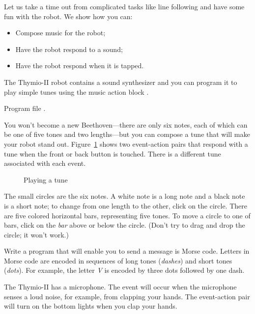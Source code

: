 \label{ch.bells}

Let us take a time out from complicated tasks like line following and
have some fun with the robot. We show how you can:
\begin{itemize}
\item Compose music for the robot;
\item Have the robot respond to a sound;
\item Have the robot respond when it is tapped.
\end{itemize}


The Thymio-II robot contains a sound synthesizer and you can program it
to play simple tunes using the music action block .


{\raggedleft \hfill Program file .}

You won't become a new Beethoven---there are only six notes, each of
which can be one of five tones and two lengths---but you can compose a
tune that will make your robot stand out. Figure~\ref{fig.music} shows
two event-action pairs that respond with a tune when the front or back
button is touched. There is a different tune associated with each event.

\begin{figure}
\begin{center}
\caption{Playing a tune}\label{fig.music}
\end{center}
\end{figure}

The small circles are the six notes. A white note is a long note
and a black note is a short note; to change from one length to the
other, click on the circle. There are five colored horizontal bars,
representing five tones. To move a circle to one of bars, click on the
\emph{bar} above or below the circle. (Don't try to drag and drop the
circle; it won't work.)

Write a program that will enable you to send a message is Morse code.
Letters in Morse code are encoded in sequences of long tones
(\emph{dashes}) and short tones (\emph{dots}). For example, the letter
\emph{V} is encoded by three dots followed by one dash.



The Thymio-II has a microphone. The event  will occur
when the microphone senses a loud noise, for example, from clapping your
hands. The event-action pair  will turn on the bottom lights
when you clap your hands.

